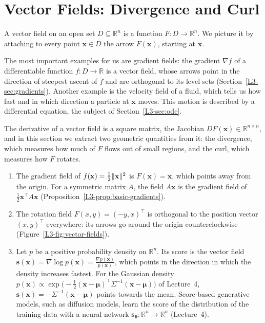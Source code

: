 \section{Vector Fields: Divergence and Curl}\label{L3-sec:vector-fields}

\begin{definition}\label{L3-def:vector-field}
    A vector field on an open set $D \subseteq \mathbb{R}^n$ is a function $F: D \to \mathbb{R}^n$. We picture it by attaching to every point $\mathbf{x} \in D$ the arrow $F(\mathbf{x})$, starting at $\mathbf{x}$.
\end{definition}

The most important examples for us are gradient fields: the gradient $\nabla f$ of a differentiable function $f: D \to \mathbb{R}$ is a vector field, whose arrows point in the direction of steepest ascent of $f$ and are orthogonal to its level sets (Section~\ref{L3-sec:gradients}). Another example is the velocity field of a fluid, which tells us how fast and in which direction a particle at $\mathbf{x}$ moves. This motion is described by a differential equation, the subject of Section~\ref{L3-sec:ode}.

The derivative of a vector field is a square matrix, the Jacobian $DF(\mathbf{x}) \in \mathbb{R}^{n \times n}$, and in this section we extract two geometric quantities from it: the divergence, which measures how much of $F$ flows out of small regions, and the curl, which measures how $F$ rotates.

\begin{example}\label{L3-ex:vector-fields}
    \begin{enumerate}
        \item The gradient field of $f(\mathbf{x}) = \frac{1}{2}\lVert \mathbf{x} \rVert^2$ is $F(\mathbf{x}) = \mathbf{x}$, which points away from the origin. For a symmetric matrix $A$, the field $A\mathbf{x}$ is the gradient field of $\frac{1}{2}\mathbf{x}^\top A\mathbf{x}$ (Proposition~\ref{L3-prop:basic-gradients}).
        \item The rotation field $F(x, y) = (-y, x)^\top$ is orthogonal to the position vector $(x, y)^\top$ everywhere: its arrows go around the origin counterclockwise (Figure~\ref{L3-fig:vector-fields}).
        \item Let $p$ be a positive probability density on $\mathbb{R}^n$. Its score is the vector field $\mathbf{s}(\mathbf{x}) = \nabla\log p(\mathbf{x}) = \frac{\nabla p(\mathbf{x})}{p(\mathbf{x})}$, which points in the direction in which the density increases fastest. For the Gaussian density $p(\mathbf{x}) \propto \exp\big(-\frac{1}{2}(\mathbf{x} - \boldsymbol{\mu})^\top\Sigma^{-1}(\mathbf{x} - \boldsymbol{\mu})\big)$ of Lecture~4, $\mathbf{s}(\mathbf{x}) = -\Sigma^{-1}(\mathbf{x} - \boldsymbol{\mu})$ points towards the mean. Score-based generative models, such as diffusion models, learn the score of the distribution of the training data with a neural network $\mathbf{s}_{\boldsymbol{\theta}}: \mathbb{R}^n \to \mathbb{R}^n$ (Lecture~4).
    \end{enumerate}
\end{example}

